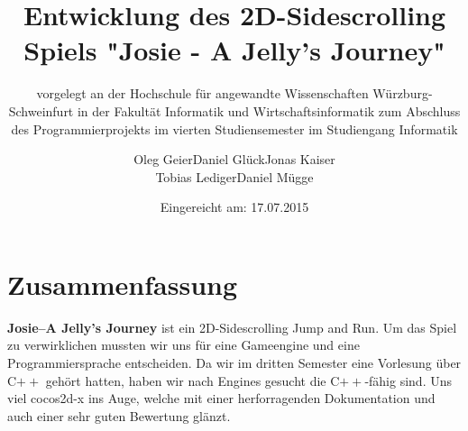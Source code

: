 \documentclass[12pt,oneside,a4paper,parskip]{scrbook}
\def\BaAuthor{Oleg Geier\qquad Daniel Glück\qquad Jonas Kaiser \\Tobias Lediger\qquad Daniel Mügge}
\def\BaTitle{Entwicklung des 2D-Sidescrolling Spiels "Josie - A Jelly's Journey"}
\def\BaSupervisorOne{Prof.\ Dr.\ Peter Braun}
\def\BaSupervisorTwo{Prof.\ Dr.\ Steffen Heinzl}
\def\BaDeadline{17.07.2015}
\newcommand{\gamename}{\textbf{Josie--A Jelly's Journey }}
\begin{document}


\frontmatter
\titlehead{%
  {Hochschule für angewandte Wissenschaften Würzburg-Schweinfurt\\
   Fakultät Informatik und Wirtschaftsinformatik}}
\subject{Projektdokumentation}
\title{\BaTitle\\[15mm]}
\subtitle{\normalsize{vorgelegt an der Hochschule f\"{u}r angewandte Wissenschaften W\"{u}rzburg-Schweinfurt in der Fakult\"{a}t Informatik und Wirtschaftsinformatik zum Abschluss des Programmierprojekts im vierten Studiensemester im Studiengang Informatik}}
\author{\BaAuthor}
\date{\normalsize{Eingereicht am: \BaDeadline}}
\publishers{
  \normalsize{Erstpr\"{u}fer: \BaSupervisorOne}\\
  \normalsize{Zweitpr\"{u}fer: \BaSupervisorTwo}\\
}


\maketitle



\section*{Zusammenfassung}

\gamename ist ein 2D-Sidescrolling Jump and Run. Um das Spiel zu verwirklichen mussten wir uns für eine Gameengine und eine Programmiersprache entscheiden. Da wir im dritten Semester eine Vorlesung über C$++$ gehört hatten, haben wir nach Engines gesucht die C$++$-fähig sind. Uns viel cocos2d-x ins Auge, welche mit einer herforragenden Dokumentation und auch einer sehr guten Bewertung glänzt. 
\end{document}
